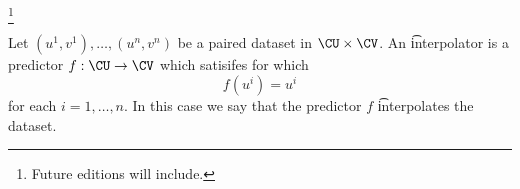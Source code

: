 
  \ifhmode\unskip\fi\footnote{
Future editions will include.
  }


Let $(u^1, v^1), \dots , (u^n, v^n)$ be a paired dataset in $\CU \times  \CV$.
An \t{interpolator} is a predictor $f: \CU \to \CV$ which satisifes for which
  \[
f(u^i) = u^i
  \]
for each $i = 1 , \dots , n$.
In this case we say that the predictor $f$ \t{interpolates} the dataset.

\blankpage
